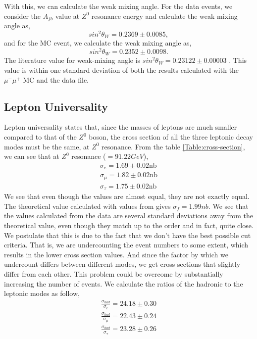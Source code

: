With this, we can calculate the weak mixing angle. For the data events, we consider the $A_{fb}$ value at $Z^0$ resonance energy and calculate the weak mixing angle as,
\begin{equation}
    sin^2\theta_W = 0.2369 \pm 0.0085,
\end{equation}
and for the MC event, we calculate the weak mixing angle as,
\begin{equation}
    sin^2\theta_W = 0.2352 \pm 0.0098.
\end{equation}
The literature value for weak-mixing angle is $sin^2\theta_W = 0.23122 \pm 0.00003$ \cite{pdg-ew}. This value is within one standard deviation of both the results calculated with the $\mu^-\mu^+$ MC and the data file.

\subsection{Lepton Universality}
Lepton universality states that, since the masses of leptons are much smaller compared to that of the $Z^0$ boson, the cross section of all the three leptonic decay modes must be the same, at $Z^0$ resonance. From the table \ref{Table:cross-section}, we can see that at $Z^0$ resonance ($=91.22 GeV$),
\begin{equation}
\begin{split}
    \sigma_e = 1.69 \pm 0.02 \text{nb} \\
    \sigma_{\mu} = 1.82 \pm 0.02 \text{nb} \\
    \sigma_{\tau} = 1.75 \pm 0.02 \text{nb}
\end{split}
\end{equation}
We see that even though the values are almost equal, they are not exactly equal. The theoretical value calculated with values from \cite{UB} gives $\sigma_f = 1.99 nb$. We see that the values calculated from the data are several standard deviations away from the theoretical value, even though they match up to the order and in fact, quite close. We postulate that this is due to the fact that we don't have the best possible cut criteria. That is, we are undercounting the event numbers to some extent, which results in the lower cross section values. And since the factor by which we undercount differs between different modes, we get cross sections that slightly differ from each other. This problem could be overcome by substantially increasing the number of events. We calculate the ratios of the hadronic to the leptonic modes as follow,
\begin{equation}
\begin{split}
    \frac{\sigma_{had}}{\sigma_e} = 24.18 \pm 0.30 \\
    \frac{\sigma_{had}}{\sigma_{\mu}} = 22.43 \pm 0.24 \\
    \frac{\sigma_{had}}{\sigma_{\tau}} = 23.28 \pm 0.26
\end{split}
\end{equation}

